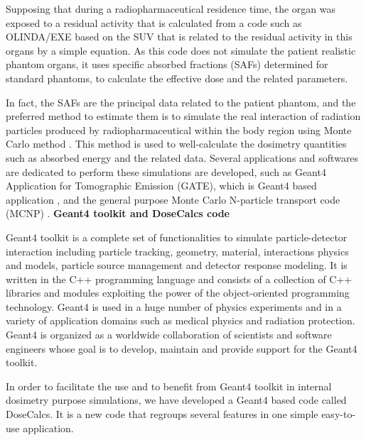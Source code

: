 \documentclass[letterpaper,12pt]{article}
\begin{document}
Supposing that during a radiopharmaceutical residence time, the organ was exposed to a residual activity that is calculated from a code such as OLINDA/EXE \cite{OLINDAEXE} based on the SUV that is related to the residual activity in this organs by a simple equation. As this code does not simulate the patient realistic phantom organs, it uses specific absorbed fractions (SAFs) determined for standard phantoms, to calculate the effective dose and the related parameters.

In fact, the SAFs are the principal data related to the patient phantom, and the preferred method to estimate them is to simulate the real interaction of radiation particles produced by radiopharmaceutical within the body region using Monte Carlo method \cite{ExplorMonteCarlo}. This method is used to well-calculate the dosimetry quantities such as absorbed energy and the related data. Several applications and softwares are dedicated to perform these simulations are developed, such as Geant4 Application for Tomographic Emission (GATE), which is Geant4 based application \cite{Geant4, Gate}, and the general purpose Monte Carlo N-particle transport code (MCNP) \cite{MCNPCode}.
\newline
\newline
\newline
\textbf{Geant4 toolkit and DoseCalcs code}
\newline

Geant4 toolkit is a complete set of functionalities to simulate particle-detector interaction including particle tracking, geometry, material, interactions physics and models, particle source management and detector response modeling. It is written in the C++ programming language and consists of a collection of C++ libraries and modules exploiting the power of the object-oriented programming technology. Geant4 is used in a huge number of physics experiments and in a variety of application domains such as medical physics and radiation protection. Geant4 is organized as a worldwide collaboration of scientists and software engineers whose goal is to develop, maintain and provide support for the Geant4 toolkit.

In order to facilitate the use and to benefit from Geant4 toolkit in internal dosimetry purpose simulations, we have developed a Geant4 based code called DoseCalcs. It is a new code that regroups several features in one simple easy-to-use application.
\end{document}
